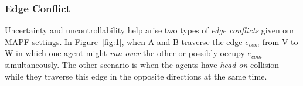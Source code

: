 \documentclass{article}
\begin{document}


\subsubsection{Edge Conflict} Uncertainty and uncontrollability help arise two types of \emph{edge conflicts} given our MAPF settings. 
In Figure~\ref{fig:1}, when A and B traverse the edge $e_{com}$ from V to W in which one agent might \emph{run-over} the other or possibly occupy $e_{com}$ simultaneously. 
The other scenario is when the agents have \emph{head-on} collision while they traverse this edge in the opposite directions at the same time. 
\end{document}
